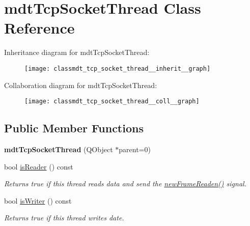 \hypertarget{classmdt_tcp_socket_thread}{
\section{mdtTcpSocketThread Class Reference}
\label{classmdt_tcp_socket_thread}
}


Inheritance diagram for mdtTcpSocketThread:\nopagebreak
\begin{figure}[H]
\begin{center}
\leavevmode
\texttt{[image: classmdt\_tcp\_socket\_thread\_\_inherit\_\_graph]}
\end{center}
\end{figure}


Collaboration diagram for mdtTcpSocketThread:\nopagebreak
\begin{figure}[H]
\begin{center}
\leavevmode
\texttt{[image: classmdt\_tcp\_socket\_thread\_\_coll\_\_graph]}
\end{center}
\end{figure}
\subsection*{Public Member Functions}
\begin{DoxyCompactItemize}
\item 
\hypertarget{classmdt_tcp_socket_thread_ab379d78b2d32a9361dbe46a009c687d4}{
{\bfseries mdtTcpSocketThread} (QObject $\ast$parent=0)}
\label{classmdt_tcp_socket_thread_ab379d78b2d32a9361dbe46a009c687d4}

\item 
bool \hyperlink{classmdt_tcp_socket_thread_a3224f12c8ff8d695975030f3f6215010}{isReader} () const 
\begin{DoxyCompactList}\small\item\em Returns true if this thread reads data and send the \hyperlink{classmdt_port_thread_a7fc2245c753fd65e1beffec211c41461}{newFrameReaden()} signal. \end{DoxyCompactList}\item 
bool \hyperlink{classmdt_tcp_socket_thread_a014ad2b3a5fbe7031eeb1d42d8f0767d}{isWriter} () const 
\begin{DoxyCompactList}\small\item\em Returns true if this thread writes date. \end{DoxyCompactList}\end{DoxyCompactItemize}



